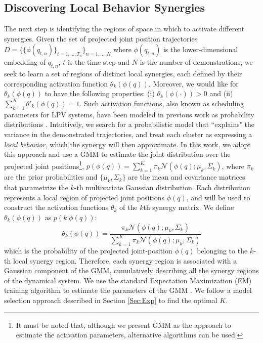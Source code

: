 \documentclass[letterpaper, 10 pt, journal, twoside, fleqn]{IEEEtran}
\begin{document}
\subsection{Discovering Local Behavior Synergies}
The next step is identifying the regions of space in which to activate different synergies. Given the set of projected joint position trajectories $D=\{\{\phi(q_{t,n})\}_{t=1,\dots, T_n}\}_{n=1,\dots,N}$ where $\phi(q_{t,n})$ is the lower-dimensional embedding of $q_{t,n}$, $t$ is the time-step and $N$ is the number of demonstrations, we seek to learn a set of regions of distinct local synergies, each defined by their corresponding activation function $\theta_k(\phi(q))$. Moreover, we would like for $\theta_k(\phi(q))$ to have the following properties: (i) $\theta_k(\phi(\cdot))>0$ and (ii) $\sum_{k=1}^{K}\theta'_k(\phi(q)) = 1$. Such activation functions, also known as scheduling parameters for LPV systems, have been modeled in previous work as probability distributions \cite{7439839, Salehian-RSS-16}. Intuitively, we search for a probabilistic model that ``explains" the variance in the demonstrated trajectories, and treat each cluster as expressing a \textit{local behavior}, which the synergy will then approximate. In this work, we adopt this approach and use a GMM to estimate the joint distribution over the projected joint positions\footnote{It must be noted that, although we present GMM as the approach to estimate the activation parameters, alternative algorithms can be used.}, $p(\phi(q)) = \sum_{k=1}^K\pi_k\mathcal{N}(\phi(q);\mu_k,\Sigma_k)$, where $\pi_k$ are the prior probabilities and $\{\mu_k,\Sigma_k\}$ are the mean and covariance matrices that parametrize the $k$-th multivariate Gaussian distribution. Each distribution represents a local region of projected joint positions $\phi(q)$, and will be used to construct the activation functions $\theta_k$ of the $k$th synergy matrix. We define $\theta_k(\phi(q))$ as $p(k|\phi(q))$:
\begin{equation}
\label{eq:theta}
\theta_k(\phi(q))= \frac{\pi_k\mathcal{N} (\phi(q); \mu_k, \Sigma_k)}{\sum_{k=1}^K \pi_k\mathcal{N} (\phi(q); \mu_k, \Sigma_k)}
\end{equation}
which is the probability of the projected joint-position $\phi(q)$ belonging to the $k$-th local synergy region. Therefore, each synergy region is associated with a Gaussian component of the GMM, cumulatively describing all the synergy regions of the dynamical system. We use the standard Expectation Maximization (EM) training algorithm to estimate the parameters of the GMM \cite{Bilmes98agentle}.  We follow a model selection approach described in Section \ref{Sec:Exp} to find the optimal $K$.
\end{document}
